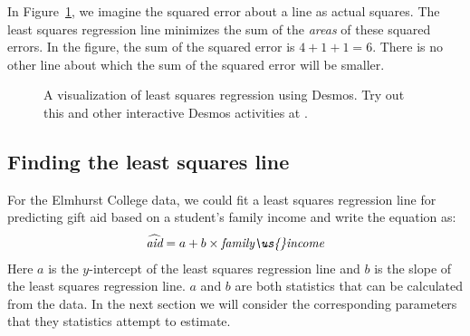 In Figure~\ref{leastSquares}, we imagine the squared error about a line as actual squares.  The least squares regression line minimizes the sum of the \emph{areas} of these squared errors.  In the figure, the sum of the squared error is $4+1+1=6$.  There is no other line about which the sum of the squared error will be smaller.

\begin{figure}[h]
\centering
{}
\caption{A visualization of least squares regression using Desmos.  Try out this and other interactive Desmos activities at .}
\label{leastSquares}
\end{figure}


\D{\newpage}
 
\subsection{Finding the least squares line}
\label{findingTheLeastSquaresLineSection}

For the Elmhurst College data, we could fit a least squares regression line for predicting gift aid based on a student's family income and write the equation as:
\begin{eqnarray*}
\widehat{\textit{aid}} = a  + b\times \textit{family\us{}income}
\end{eqnarray*}
Here $a$ is the $y$-intercept of the least squares regression line and $b$ is the slope of the least squares regression line.  $a$ and $b$ are both statistics that can be calculated from the data.  In the next section we will consider the corresponding parameters that they statistics attempt to estimate.  


